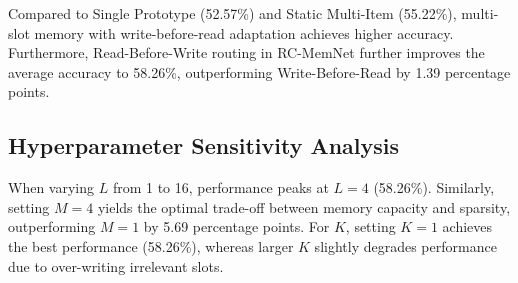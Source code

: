 \documentclass[letterpaper]{article} %
\begin{document}
Compared to Single Prototype (52.57\%) and Static Multi-Item (55.22\%), multi-slot memory with write-before-read adaptation achieves higher accuracy. Furthermore, Read-Before-Write routing in RC-MemNet further improves the average accuracy to 58.26\%, outperforming Write-Before-Read by 1.39 percentage points.

\subsection{Hyperparameter Sensitivity Analysis}

\begin{table}[t]
\centering
\caption{Hyperparameter sensitivity analysis on $L$ (number of region prompts), $M$ (slots per category), and $K$ (top-$K$ write slots).}
\label{tab:sensitivity}
\end{table}

When varying $L$ from 1 to 16, performance peaks at $L=4$ (58.26\%). Similarly, setting $M=4$ yields the optimal trade-off between memory capacity and sparsity, outperforming $M=1$ by 5.69 percentage points. For $K$, setting $K=1$ achieves the best performance (58.26\%), whereas larger $K$ slightly degrades performance due to over-writing irrelevant slots.
\end{document}
